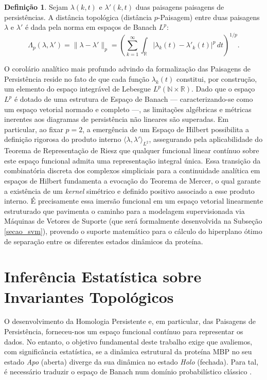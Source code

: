 \documentclass[12pt, a4paper]{article}
\theoremstyle{plain}
\theoremstyle{definition}
\newtheorem{definition}{Definição}[section]
\theoremstyle{remark}
\newcommand{\ident}{\hspace{2em}}
\begin{document}
\begin{definition}
    Sejam $\lambda (k,t)$ e $\lambda '(k,t)$ duas paisagens paisagens de persistências. A distância topológica (distância $p$-Paisagem) entre duas paisagens $\lambda$ e $\lambda'$ é dada pela norma em espaços de Banach $L^p$:
    \begin{equation*}
        \Lambda_p(\lambda, \lambda') = \|\lambda - \lambda'\|_p = \left( \sum_{k=1}^\infty \int_{\mathbb{R}} |\lambda_k(t) - \lambda'_k(t)|^p \, dt \right)^{1/p}.
    \end{equation*}
\end{definition}

\ident O corolário analítico mais profundo advindo da formalização das Paisagens de Persistência reside no fato de que cada função $\lambda_k(t)$ constitui, por construção, um elemento do espaço integrável de Lebesgue $L^p(\mathbb{N} \times \mathbb{R})$. Dado que o espaço $L^p$ é dotado de uma estrutura de Espaço de Banach — caracterizando-se como um espaço vetorial normado e completo —, as limitações algébricas e métricas inerentes aos diagramas de persistência não lineares são superadas. Em particular, ao fixar $p = 2$, a emergência de um Espaço de Hilbert possibilita a definição rigorosa do produto interno $\langle \lambda, \lambda' \rangle_{L^2}$, assegurando pela aplicabilidade do Teorema de Representação de Riesz que qualquer funcional linear contínuo sobre este espaço funcional admita uma representação integral única. Essa transição da combinatória discreta dos complexos simpliciais para a continuidade analítica em espaços de Hilbert fundamenta a evocação do Teorema de Mercer, o qual garante a existência de um \textit{kernel} simétrico e definido positivo associado a esse produto interno. É precisamente essa imersão funcional em um espaço vetorial linearmente estruturado que pavimenta o caminho para a modelagem supervisionada via Máquinas de Vetores de Suporte (que será formalmente desenvolvida na Subseção \ref{secao_svm}), provendo o suporte matemático para o cálculo do hiperplano ótimo de separação entre os diferentes estados dinâmicos da proteína.

\section{Inferência Estatística sobre Invariantes Topológicos}

\ident O desenvolvimento da Homologia Persistente e, em particular, das Paisagens de Persistência, forneceu-nos um espaço funcional contínuo para representar os dados. No entanto, o objetivo fundamental deste trabalho exige que avaliemos, com significância estatística, se a dinâmica estrutural da proteína MBP no seu estado \textit{Apo} (aberta) diverge da sua dinâmica no estado \textit{Holo} (fechada). Para tal, é necessário traduzir o espaço de Banach num domínio probabilístico clássico \cite{devore2012}.
\end{document}
